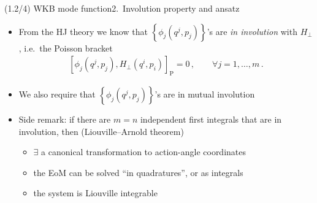 \documentclass[mathserif]{beamer}
\newcommand{\sbr}[1]{{\left[#1\right]}}
\newcommand{\cbr}[1]{{\left\{#1\right\}}}
\newcommand{\rfun}[2]{#1\mathopen{}\left(#2\right)\mathclose{}}
\begin{document}
\begin{frame}{(1.2/4) WKB mode function}{2.\ Involution property and ansatz}
\begin{itemize}
    \item From the HJ theory we know that $\cbr{\rfun{\phi_j}{q^j, p_j}}$'s are \emph{in involution} with $H_\perp$, i.e.\ the Poisson bracket
\begin{align}
    \sbr{\rfun{\phi_j}{q^j, p_j}, \rfun{H_\perp}{q^i, p_i}}_\text{P} = 0\,,
    \qquad \forall j = 1, \ldots, m\,.
\end{align}
\item
We also require that $\cbr{\rfun{\phi_j}{q^j, p_j}}$'s are in mutual involution
\end{itemize}

\begin{itemize}
    \item Side remark: if there are $m=n$ independent first integrals that are in involution, then (Liouville--Arnold theorem) 
    \begin{itemize}
        \item $\exists$ a canonical transformation to action-angle coordinates
        \item the EoM can be solved ``in quadratures'', or as integrals
        \item the system is Liouville integrable
    \end{itemize}
\end{itemize}
\end{frame}
\end{document}
